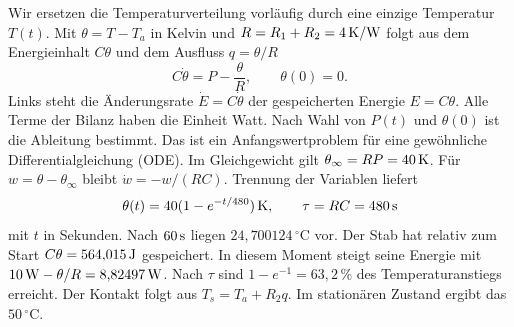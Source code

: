 Wir ersetzen die Temperaturverteilung vorläufig durch eine einzige Temperatur \(T(t)\). Mit \(\theta=T-T_a\) in Kelvin und \(R=R_1+R_2=4\,\mathrm{K/W}\) folgt aus dem Energieinhalt \(C\theta\) und dem Ausfluss \(q=\theta/R\)
\[
 C\dot\theta=P-\frac{\theta}{R},\qquad \theta(0)=0.
\]
Links steht die Änderungsrate \(\dot E=C\dot\theta\) der gespeicherten Energie \(E=C\theta\). Alle Terme der Bilanz haben die Einheit Watt. Nach Wahl von \(P(t)\) und \(\theta(0)\) ist die Ableitung bestimmt. Das ist ein Anfangswertproblem für eine gewöhnliche Differentialgleichung (ODE).
Im Gleichgewicht gilt \(\theta_\infty=RP=40\,\mathrm{K}\). Für \(w=\theta-\theta_\infty\) bleibt \(\dot w=-w/(RC)\). Trennung der Variablen liefert
\[
 \theta(t)=40(1-e^{-t/480})\,\mathrm{K},\qquad \tau=RC=480\,\mathrm{s}
\]
mit \(t\) in Sekunden. Nach \(60\,\mathrm{s}\) liegen \(24{,}700124\,^\circ\mathrm C\) vor. Der Stab hat relativ zum Start \(C\theta=564{,}015\,\mathrm{J}\) gespeichert. In diesem Moment steigt seine Energie mit \(10\,\mathrm{W}-\theta/R=8{,}82497\,\mathrm{W}\). Nach \(\tau\) sind \(1-e^{-1}=63{,}2\,\%\) des Temperaturanstiegs erreicht. Der Kontakt folgt aus \(T_s=T_a+R_2q\). Im stationären Zustand ergibt das \(50\,^\circ\mathrm C\).

